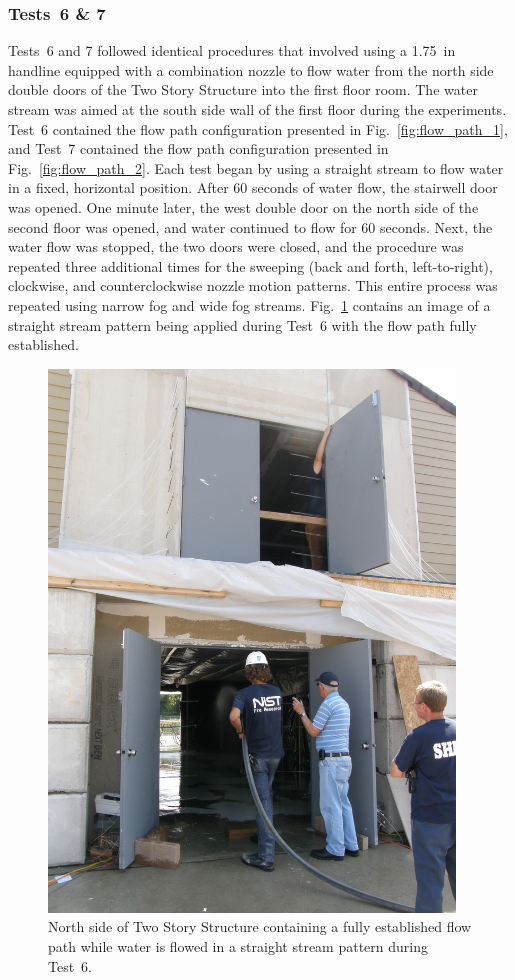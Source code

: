\documentclass[12pt,oneside]{book}
\begin{document}
\subsubsection{Tests~6 \& 7}
Tests~6 and 7 followed identical procedures that involved using a 1.75~in handline equipped with a combination nozzle to flow water from the north side double doors of the Two Story Structure into the first floor room. The water stream was aimed at the south side wall of the first floor during the experiments. Test~6 contained the flow path configuration presented in Fig.~\ref{fig:flow_path_1}, and Test~7 contained the flow path configuration presented in Fig.~\ref{fig:flow_path_2}. Each test began by using a straight stream to flow water in a fixed, horizontal position. After 60 seconds of water flow, the stairwell door was opened. One minute later, the west double door on the north side of the second floor was opened, and water continued to flow for 60 seconds. Next, the water flow was stopped, the two doors were closed, and the procedure was repeated three additional times for the sweeping (back and forth, left-to-right), clockwise, and counterclockwise nozzle motion patterns. This entire process was repeated using narrow fog and wide fog streams. Fig.~\ref{fig:test_6_pic} contains an image of a straight stream pattern being applied during Test~6 with the flow path fully established.

\begin{figure}[!ht]
	\includegraphics[width=4.25in]{../Figures/Pictures/Test_18}
	\caption[North side of Two Story Structure containing a fully established flow path during Test~6.]{North side of Two Story Structure containing a fully established flow path while water is flowed in a straight stream pattern during Test~6.}
	\label{fig:test_6_pic}
\end{figure}
\FloatBarrier
\end{document}
